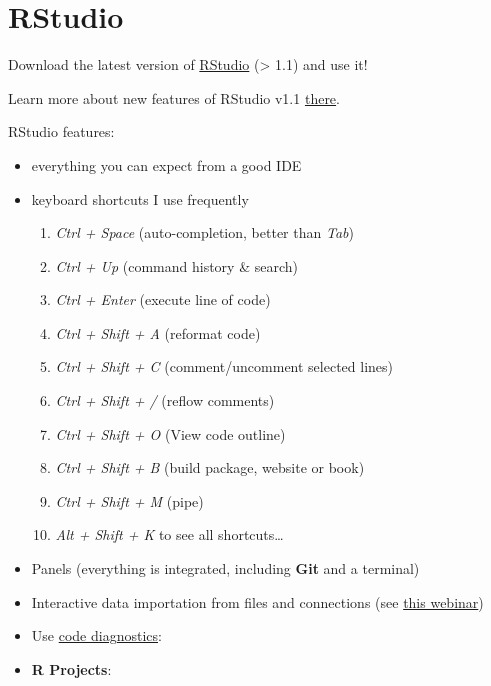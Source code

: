\documentclass[]{book}
\providecommand{\tightlist}{%
  \setlength{\itemsep}{0pt}\setlength{\parskip}{0pt}}
\begin{document}
\section{RStudio}\label{rstudio}

Download the latest version of
\href{https://www.rstudio.com/products/rstudio/download/\#download}{RStudio}
(\textgreater{} 1.1) and use it!

Learn more about new features of RStudio v1.1
\href{https://www.rstudio.com/resources/videos/rstudio-1-1-new-features/}{there}.

RStudio features:

\begin{itemize}
\item
  everything you can expect from a good IDE
\item
  keyboard shortcuts I use frequently

  \begin{enumerate}
  \def\labelenumi{\arabic{enumi}.}
  \tightlist
  \item
    \emph{Ctrl + Space} (auto-completion, better than \emph{Tab})
  \item
    \emph{Ctrl + Up} (command history \& search)
  \item
    \emph{Ctrl + Enter} (execute line of code)
  \item
    \emph{Ctrl + Shift + A} (reformat code)
  \item
    \emph{Ctrl + Shift + C} (comment/uncomment selected lines)
  \item
    \emph{Ctrl + Shift + /} (reflow comments)
  \item
    \emph{Ctrl + Shift + O} (View code outline)
  \item
    \emph{Ctrl + Shift + B} (build package, website or book)
  \item
    \emph{Ctrl + Shift + M} (pipe)
  \item
    \emph{Alt + Shift + K} to see all shortcuts\ldots{}
  \end{enumerate}
\item
  Panels (everything is integrated, including \textbf{Git} and a
  terminal)
\item
  Interactive data importation from files and connections (see
  \href{https://www.rstudio.com/resources/webinars/importing-data-into-r/}{this
  webinar})
\item
  Use
  \href{https://support.rstudio.com/hc/en-us/articles/205753617-Code-Diagnostics}{code
  diagnostics}:
\item
  \textbf{R Projects}:


\end{itemize}
\end{document}
